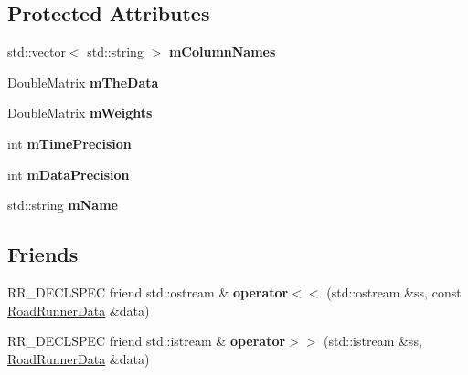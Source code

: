 \subsection*{Protected Attributes}
\begin{DoxyCompactItemize}
\item 
\hypertarget{classrr_1_1_road_runner_data_ab8717fd648deaa62f96f10b3f017dd19}{std\-::vector$<$ std\-::string $>$ {\bfseries m\-Column\-Names}}\label{classrr_1_1_road_runner_data_ab8717fd648deaa62f96f10b3f017dd19}

\item 
\hypertarget{classrr_1_1_road_runner_data_a881dfd840f8cfaf304f5a8134a82fc08}{Double\-Matrix {\bfseries m\-The\-Data}}\label{classrr_1_1_road_runner_data_a881dfd840f8cfaf304f5a8134a82fc08}

\item 
\hypertarget{classrr_1_1_road_runner_data_a35237d1ad85d1610d907c9dd3168517d}{Double\-Matrix {\bfseries m\-Weights}}\label{classrr_1_1_road_runner_data_a35237d1ad85d1610d907c9dd3168517d}

\item 
\hypertarget{classrr_1_1_road_runner_data_a7580d39e2d41620af80842a1af411beb}{int {\bfseries m\-Time\-Precision}}\label{classrr_1_1_road_runner_data_a7580d39e2d41620af80842a1af411beb}

\item 
\hypertarget{classrr_1_1_road_runner_data_a13da357ba080cf43f424947d996bfc4c}{int {\bfseries m\-Data\-Precision}}\label{classrr_1_1_road_runner_data_a13da357ba080cf43f424947d996bfc4c}

\item 
\hypertarget{classrr_1_1_road_runner_data_a7381cafbd851a5646d8fd4985eeb5bd6}{std\-::string {\bfseries m\-Name}}\label{classrr_1_1_road_runner_data_a7381cafbd851a5646d8fd4985eeb5bd6}

\end{DoxyCompactItemize}
\subsection*{Friends}
\begin{DoxyCompactItemize}
\item 
\hypertarget{classrr_1_1_road_runner_data_a86bcd0a6b613c0776ba6ddc658345116}{R\-R\-\_\-\-D\-E\-C\-L\-S\-P\-E\-C friend std\-::ostream \& {\bfseries operator$<$$<$} (std\-::ostream \&ss, const \hyperlink{classrr_1_1_road_runner_data}{Road\-Runner\-Data} \&data)}\label{classrr_1_1_road_runner_data_a86bcd0a6b613c0776ba6ddc658345116}

\item 
\hypertarget{classrr_1_1_road_runner_data_af18f4e6f8e1559b84f469054eff433a6}{R\-R\-\_\-\-D\-E\-C\-L\-S\-P\-E\-C friend std\-::istream \& {\bfseries operator$>$$>$} (std\-::istream \&ss, \hyperlink{classrr_1_1_road_runner_data}{Road\-Runner\-Data} \&data)}\label{classrr_1_1_road_runner_data_af18f4e6f8e1559b84f469054eff433a6}

\end{DoxyCompactItemize}


